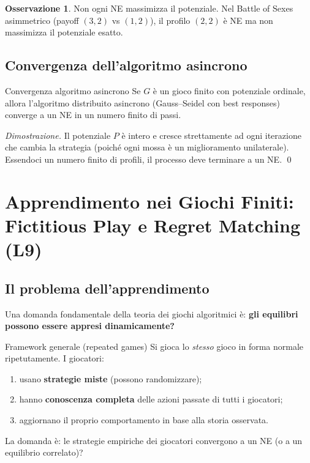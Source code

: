 \documentclass[12pt,a4paper,twoside]{book}
\theoremstyle{plain}
\theoremstyle{definition}
\newtheorem{remark}[theorem]{Osservazione}
\begin{document}
\begin{remark}
Non ogni NE massimizza il potenziale. Nel Battle of Sexes asimmetrico (payoff $(3,2)$ vs $(1,2)$), il profilo $(2,2)$ è NE ma non massimizza il potenziale esatto.
\end{remark}

\section{Convergenza dell'algoritmo asincrono}

\begin{thmbox}{Convergenza algoritmo asincrono}
Se $G$ è un gioco finito con potenziale ordinale, allora l'algoritmo distribuito asincrono (Gauss--Seidel con best responses) converge a un NE in un numero finito di passi.
\end{thmbox}
\textit{Dimostrazione.} Il potenziale $P$ è intero e cresce strettamente ad ogni iterazione che cambia la strategia (poiché ogni mossa è un miglioramento unilaterale). Essendoci un numero finito di profili, il processo deve terminare a un NE. \qed

\chapter{Apprendimento nei Giochi Finiti: Fictitious Play e Regret Matching (L9)}

\section{Il problema dell'apprendimento}

Una domanda fondamentale della teoria dei giochi algoritmici è: \textbf{gli equilibri possono essere appresi dinamicamente?}

\begin{defbox}{Framework generale (repeated games)}
Si gioca lo \emph{stesso} gioco in forma normale ripetutamente. I giocatori:
\begin{enumerate}
  \item usano \textbf{strategie miste} (possono randomizzare);
  \item hanno \textbf{conoscenza completa} delle azioni passate di tutti i giocatori;
  \item aggiornano il proprio comportamento in base alla storia osservata.
\end{enumerate}
La domanda è: le strategie empiriche dei giocatori convergono a un NE (o a un equilibrio correlato)?
\end{defbox}
\end{document}
